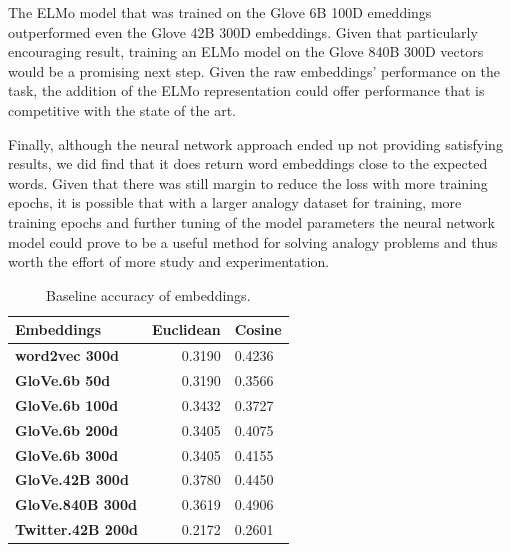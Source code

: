 \documentclass[11pt]{article}
\begin{document}
The ELMo model that was trained on the Glove 6B 100D emeddings
outperformed even the Glove 42B 300D embeddings. Given that particularly
encouraging result, training an ELMo model on the Glove 840B 300D
vectors would be a promising next step. Given the raw embeddings'
performance on the task, the addition of the ELMo representation could
offer performance that is competitive with the state of the art.

Finally, although the neural network approach ended up not providing
satisfying results, we did find that it does return word embeddings
close to the expected words. Given that there was still margin to reduce
the loss with more training epochs, it is possible that with a larger
analogy dataset for training, more training epochs and further tuning of
the model parameters the neural network model could prove to be a useful
method for solving analogy problems and thus worth the effort of more
study and experimentation.




\begin{table}[h]
\begin{center}
\begin{tabular}{|l|rl|}
\hline \bf Embeddings & Euclidean & \bf Cosine \\ \hline
	\bf word2vec 300d & 0.3190 & 0.4236 \\
	\bf GloVe.6b 50d & 0.3190 & 0.3566 \\
	\bf GloVe.6b 100d & 0.3432 & 0.3727 \\
	\bf GloVe.6b 200d & 0.3405 & 0.4075 \\
	\bf GloVe.6b 300d & 0.3405 & 0.4155 \\
	\bf GloVe.42B 300d & 0.3780 & 0.4450 \\
	\bf GloVe.840B 300d & 0.3619 & 0.4906 \\
	\bf Twitter.42B 200d & 0.2172 & 0.2601 \\
\end{tabular}
\end{center}
\caption{\label{font-table} Baseline accuracy of embeddings. }
\end{table}
\end{document}
